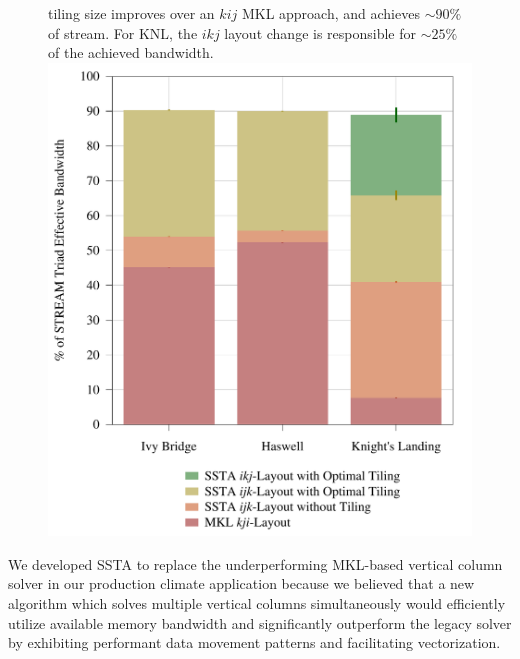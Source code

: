 \documentclass{sig-alternate-05-2015}
\begin{document}
\begin{figure}[!bth]
\begin{minipage}{0.49\textwidth}
{      tiling size improves over an \(kij\) MKL approach, and achieves
      ${\sim}90\%$ of stream. For KNL, the \(ikj\) layout change is responsible
      for \({\sim}25\%\) of the achieved bandwidth.
    }
    \label{fig:results:efficiency}
    \includegraphics[width=0.95\columnwidth]{figures/post_tsb_impact_of_optimizations_histogram_09_03_2016_09_04_2016_1socket.pdf}
    \label{fig:results:efficiency}
  \end{minipage}
\end{figure}

We developed SSTA to replace the underperforming MKL-based vertical column
  solver in our production climate application because we believed that a new
  algorithm which solves multiple vertical columns simultaneously would
  efficiently utilize available memory bandwidth and significantly outperform the
  legacy solver by exhibiting performant data movement patterns and facilitating
  vectorization.
\end{document}
